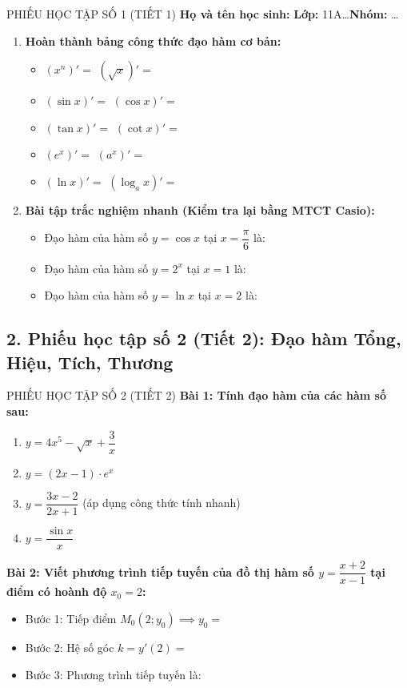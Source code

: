 \documentclass[12pt, a4paper]{article}
\begin{document}
\begin{pedabox}{PHIẾU HỌC TẬP SỐ 1 (TIẾT 1)}
\textbf{Họ và tên học sinh:} \dotfill \textbf{Lớp:} 11A\dots \quad \textbf{Nhóm:} \dots
\begin{enumerate}[leftmargin=0.6cm]
    \item \textbf{Hoàn thành bảng công thức đạo hàm cơ bản:}
    \begin{itemize}
        \item $(x^n)' = $ \dotfill \quad $(\sqrt{x})' = $ \dotfill
        \item $(\sin x)' = $ \dotfill \quad $(\cos x)' = $ \dotfill
        \item $(\tan x)' = $ \dotfill \quad $(\cot x)' = $ \dotfill
        \item $(e^x)' = $ \dotfill \quad $(a^x)' = $ \dotfill
        \item $(\ln x)' = $ \dotfill \quad $(\log_a x)' = $ \dotfill
    \end{itemize}

    \item \textbf{Bài tập trắc nghiệm nhanh (Kiểm tra lại bằng MTCT Casio):}
    \begin{itemize}
        \item Đạo hàm của hàm số $y = \cos x$ tại $x = \dfrac{\pi}{6}$ là: \dotfill
        \item Đạo hàm của hàm số $y = 2^x$ tại $x = 1$ là: \dotfill
        \item Đạo hàm của hàm số $y = \ln x$ tại $x = 2$ là: \dotfill
    \end{itemize}
\end{enumerate}
\end{pedabox}

\subsection*{2. Phiếu học tập số 2 (Tiết 2): Đạo hàm Tổng, Hiệu, Tích, Thương}

\begin{pedabox}{PHIẾU HỌC TẬP SỐ 2 (TIẾT 2)}
\textbf{Bài 1: Tính đạo hàm của các hàm số sau:}
\begin{enumerate}[leftmargin=0.6cm]
    \item $y = 4x^5 - \sqrt{x} + \dfrac{3}{x}$ \dotfill
    \item $y = (2x - 1) \cdot e^x$ \dotfill
    \item $y = \dfrac{3x - 2}{2x + 1}$ (áp dụng công thức tính nhanh) \dotfill
    \item $y = \dfrac{\sin x}{x}$ \dotfill
\end{enumerate}

\textbf{Bài 2: Viết phương trình tiếp tuyến của đồ thị hàm số $y = \dfrac{x + 2}{x - 1}$ tại điểm có hoành độ $x_0 = 2$:}
\begin{itemize}
    \item Bước 1: Tiếp điểm $M_0(2; y_0) \implies y_0 = $ \dotfill
    \item Bước 2: Hệ số góc $k = y'(2) = $ \dotfill
    \item Bước 3: Phương trình tiếp tuyến là: \dotfill
\end{itemize}
\end{pedabox}
\end{document}
